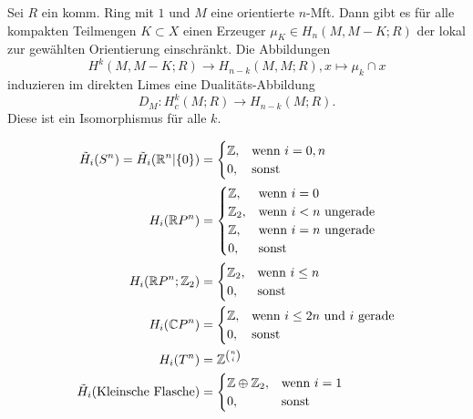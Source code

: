 \documentclass{cheat-sheet}
\newcommand{\RH}{\tilde{H}} %
\newcommand{\ZM}[1]{\Z_{#1}} %
\begin{document}
\begin{satz}
  Sei $R$ ein komm. Ring mit $1$ und $M$ eine orientierte $n$-Mft. Dann gibt es für alle kompakten Teilmengen $K \subset X$ einen Erzeuger $\mu_K \in H_n(M, M-K; R)$ der lokal zur gewählten Orientierung einschränkt. Die Abbildungen
  \[ H^k(M, M - K; R) \to H_{n-k}(M, M; R), x \mapsto \mu_k \cap x \]
  induzieren im direkten Limes eine Dualitäts-Abbildung
  \[ D_M : H^k_c(M; R) \to H_{n-k}(M; R). \]
  Diese ist ein Isomorphismus für alle $k$.
\end{satz}




\begin{bsp}
  \begin{align*}
    \RH_i(S^n) = \RH_i(\R^n|\{0\}) & = \begin{cases}
      \Z, & \text{wenn $i=0,n$} \\
      0, & \text{sonst}
    \end{cases} \\
    H_i(\R P^n) & = \begin{cases}
      \Z, & \text{wenn $i=0$} \\
      \ZM{2}, & \text{wenn $i < n$ ungerade} \\
      \Z, & \text{wenn $i=n$ ungerade} \\
      0, & \text{sonst}
    \end{cases} \\
    H_i(\R P^n; \ZM{2}) & = \begin{cases}
      \ZM{2}, & \text{wenn $i \leq n$} \\
      0, & \text{sonst}
    \end{cases} \\
    H_i(\C P^n) & = \begin{cases}
      \Z, & \text{wenn $i \leq 2n$ und $i$ gerade} \\
      0, & \text{sonst}
    \end{cases} \\
    H_i(T^n) & = \Z^{\binom{n}{i}} \\
    \RH_i(\text{Kleinsche Flasche}) & = \begin{cases}
      \Z \oplus \ZM{2}, & \text{wenn $i=1$} \\
      0, & \text{sonst}
    \end{cases}
  \end{align*}
\end{bsp}
\end{document}
